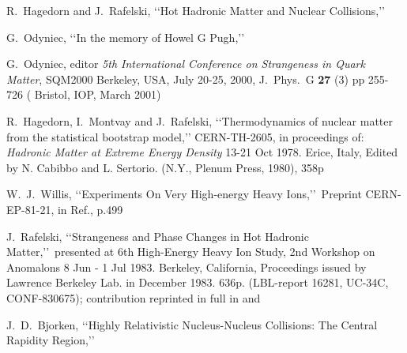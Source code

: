 \begin{thebibliography}{100}

  R.~Hagedorn and J.~Rafelski,
\lq\lq Hot Hadronic Matter and Nuclear Collisions,\rq\rq
{} 


G.~Odyniec, 
 \lq\lq In the memory of Howel G Pugh,\rq\rq\

  G.~Odyniec, editor
   {\it 5th International Conference on Strangeness in Quark Matter}, SQM2000 Berkeley, USA, July 20-25, 2000,
  J.\ Phys.\ G {\bf 27} (3) pp 255-726 ( Bristol, IOP, March 2001) 
  
  R.~Hagedorn, I.~Montvay and J.~Rafelski,
\lq\lq Thermodynamics of nuclear matter from the statistical bootstrap model,\rq\rq
  CERN-TH-2605, in proceedings of: \textit{Hadronic Matter at Extreme Energy Density}	 13-21 Oct 1978. Erice, Italy,  Edited by N. Cabibbo and L. Sertorio. (N.Y., Plenum Press, 1980),  358p 

  W.~J.~Willis,
\lq\lq Experiments On Very High-energy Heavy Ions,\rq\rq\
 Preprint CERN-EP-81-21, in Ref.\cite{Bock:1980GSI}, p.499 
 
\bibitem{Rafelski:1983im} 
  J.~Rafelski,
\lq\lq Strangeness and Phase Changes in Hot Hadronic Matter,\rq\rq\
presented at  6th High-Energy Heavy Ion Study, 2nd Workshop on Anomalons	
8 Jun - 1 Jul 1983. Berkeley, California, Proceedings issued by Lawrence Berkeley Lab. in December 1983. 636p. (LBL-report 16281, UC-34C, CONF-830675); contribution reprinted in full in  and 


  
  J.~D.~Bjorken,
\lq\lq  Highly Relativistic Nucleus-Nucleus Collisions: The Central Rapidity Region,\rq\rq\
  

\end{thebibliography}
